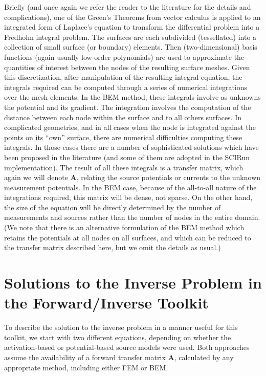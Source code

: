 \documentclass[fleqn,11pt,openany]{book}
\begin{document}
Briefly (and once again we refer the reader to the literature for the
details and complications), one of the Green's Theorems from vector
calculus is applied to an integrated form of Laplace's equation to transform the
differential problem into a Fredholm integral problem. The surfaces are
each subdivided (tessellated) into a collection of small surface (or
boundary) elements. Then (two-dimensional) basis functions (again usually
low-order polynomials) are used to
approximate the quantities of interest between the nodes of the resulting
surface meshes. Given this discretization, after
manipulation of the resulting integral equation,
the integrals required can
be computed through a series of numerical integrations over the mesh
elements.
In the BEM method, these integrals involve as unknowns the
potential and its gradient. The integration involves the computation of the
distance between each node within the surface and to all others surfaces.
In complicated geometries, and in all cases when the node is integrated against the points on its ``own''
surface, there are numerical difficulties computing these integrals. In those cases
there are a number of sophisticated solutions which have been proposed in the literature (and
some of them are adopted in the SCIRun implementation).
The result of all these integrals is a transfer matrix, which again we will
denote $\mathbf{A}$, relating the source potentials or currents to the
unknown measurement potentials. In the BEM case, because of the all-to-all
nature of the integrations required, this matrix will be dense, not
sparse. On the other hand, the size of the equation will be directly
determined by the number of measurements and sources rather than the
number of nodes in the entire domain. (We note that there is an alternative
formulation of the BEM method which retains the potentials at all nodes on
all surfaces, and which can be reduced to the transfer matrix described
here, but we omit the details as usual.)


\section{Solutions to the Inverse Problem in the Forward/Inverse Toolkit}

To describe the solution to the inverse problem in a manner useful for this
toolkit, we start with two different equations, depending on whether the
activation-based or potential-based source models were used. Both
approaches assume the availability of a forward transfer matrix
$\mathbf{A}$, calculated by any appropriate method, including either FEM or
BEM.
\end{document}
